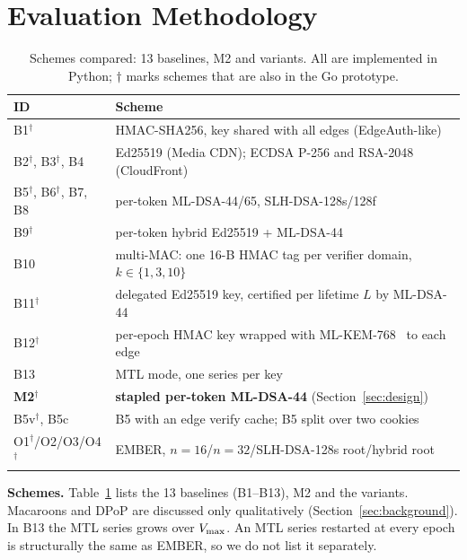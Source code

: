 \section{Evaluation Methodology}
\label{sec:method}

\begin{table}[t]
\centering
\caption{Schemes compared: 13 baselines, M2 and variants. All are implemented in Python; $\dagger$ marks schemes that are also in the Go prototype.}
\label{tab:baselines}
\footnotesize
\setlength{\tabcolsep}{3pt}
\begin{tabular}{@{}lp{6.6cm}@{}}
\toprule
ID & Scheme \\
\midrule
B1$^\dagger$ & HMAC-SHA256, key shared with all edges (EdgeAuth-like) \\
B2$^\dagger$, B3$^\dagger$, B4 & Ed25519 (Media CDN); ECDSA P-256 and RSA-2048 (CloudFront) \\
B5$^\dagger$, B6$^\dagger$, B7, B8 & per-token ML-DSA-44/65, SLH-DSA-128s/128f \\
B9$^\dagger$ & per-token hybrid Ed25519 + ML-DSA-44 \\
B10 & multi-MAC: one 16-B HMAC tag per verifier domain, $k\in\{1,3,10\}$ \\
B11$^\dagger$ & delegated Ed25519 key, certified per lifetime $L$ by ML-DSA-44 \\
B12$^\dagger$ & per-epoch HMAC key wrapped with ML-KEM-768~\cite{fips203} to each edge \\
B13 & MTL mode, one series per key~\cite{draft-mtl-mode} \\
\textbf{M2}$^\dagger$ & \textbf{stapled per-token ML-DSA-44} (Section~\ref{sec:design}) \\
\midrule
B5v$^\dagger$, B5c & B5 with an edge verify cache; B5 split over two cookies \\
O1$^\dagger$/O2/O3/O4$^\dagger$ & EMBER, $n=16$/$n=32$/SLH-DSA-128s root/hybrid root \\
\bottomrule
\end{tabular}
\end{table}

\textbf{Schemes.} Table~\ref{tab:baselines} lists the 13 baselines (B1--B13), M2 and the variants. Macaroons and DPoP are discussed only qualitatively (Section~\ref{sec:background}). In B13 the MTL series grows over $V_{\max}$. An MTL series restarted at every epoch is structurally the same as EMBER, so we do not list it separately.

